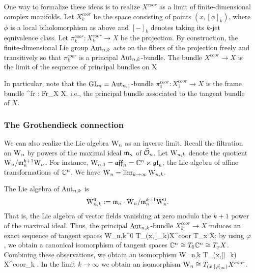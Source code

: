 \documentclass[10pt]{amsart}
\begin{document}
One way to formalize these ideas is to realize $X^{coor}$ as a limit of finite-dimensional complex manifolds. 
Let $X_k^{coor}$ be the space consisting of points $(x, [\phi]_k)$, 
where $\phi$ is a local biholomorphism as above and $[-]_k$ denotes taking its $k$-jet equivalence class. 
Let $\pi_k^{coor} : X^{coor}_k \to X$ be the projection. 
By construction, the finite-dimensional Lie group ${\rm Aut}_{n,k}$ acts on the fibers of the projection freely and transitively 
so that $\pi_k^{coor}$ is a principal ${\rm Aut}_{n,k}$-bundle. The bundle $X^{coor} \to X$ is the limit of the sequence of principal bundles on X
\ben
{}
\een

In particular, note that the ${\rm GL}_n = {\rm Aut}_{n,1}$-bundle $\pi_1^{coor} : X^{coor}_1 \to X$ is the frame bundle
\ben
\pi^{fr} : {\rm Fr}_X \to X,
\een
i.e., the principal bundle associated to the tangent bundle of $X$.

\subsubsection{The Grothendieck connection} 

We can also realize the Lie algebra ${{\rm W}_n}$ as an inverse limit. 
Recall the filtration on ${{\rm W}_n}$ by powers of the maximal ideal ${\mathfrak m}_n$ of $\widehat{\mathcal O}_n$. 
Let ${\rm W}_{n,k}$ denote the quotient ${{\rm W}_n} / {\mathfrak m}_n^{k+1} {{\rm W}_n}$. 
For instance, ${\rm W}_{n,1} = \mathfrak{aff}_n = \mathbb C^n \ltimes {\mathfrak{gl}}_n$, the Lie algebra of affine transformations of $\mathbb C^n$. We have ${{\rm W}_n} = \lim_{k \to \infty} {\rm W}_{n,k}$. 

The Lie algebra of ${\rm Aut}_{n,k}$ is
\[
{\rm W}_{n,k}^0 := {\mathfrak m}_n \cdot {{\rm W}_n} /{\mathfrak m}_n^{k+1} {{\rm W}^0_n} .
\]
That is, the Lie algebra of vector fields vanishing at zero modulo the $k+1$ power of the maximal ideal. Thus, the principal ${\rm Aut}_{n,k}$-bundle $X_{k}^{coor} \to X$ induces an exact sequence of tangent spaces
\ben
{\rm W}_{n,k}^0 \to T_{(x,[\varphi]_k)}X^{coor} \to T_x X;
\een
by using $\varphi$, we obtain a canonical isomorphism of tangent spaces $\mathbb C^n \cong T_0 \mathbb C^n \cong T_x X$. Combining these observations, we obtain an isomorphism
\ben
{\rm W}_{n,k} \cong T_{(x,[\varphi]_k)} X^{coor}_k .
\een
In the limit $k \to \infty$ we obtain an isomorphism ${{\rm W}_n} \cong T_{(x,[\varphi]_\infty)} X^{coor}$. 
\end{document}
